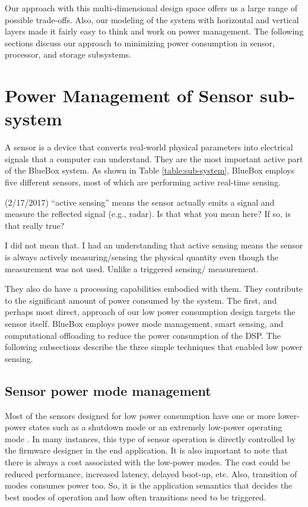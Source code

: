  
Our approach with this multi-dimensional design space offers us a
large range of possible trade-offs. Also, our modeling of the system
with horizontal and vertical layers made it fairly easy to think and
work on power management. The following sections discuss our approach
to minimizing power consumption in sensor, processor, and storage
subsystems.
 
 \section{Power Management of Sensor sub-system}
 
A sensor is a device that converts real-world physical parameters
into electrical signals that a computer can understand. They are the
most important active part of the BlueBox system. As shown in Table
\ref{table:sub-system}, BlueBox employs five different sensors, most
of which are performing active real-time sensing.
\begin{cmtPai}
	(2/17/2017) ``active sensing'' means the sensor actually emits a
	signal and measure the reflected signal (e.g., radar). Is that what
	you mean here? If so, is that really true?
\end{cmtPai}

\begin{cmtSMS}
		I did not mean that. I had an understanding that active sensing means the sensor is always actively measuring/sensing the physical quantity even though the measurement was not used. Unlike a triggered sensing/ measurement.
		 	
\end{cmtSMS}

They also do have a processing capabilities embodied with them. They
contribute to the significant amount of power consumed by the system.
The first, and perhaps most direct, approach of our low power
consumption design targets the sensor itself. BlueBox employs power
mode management, smart sensing, and computational offloading to
reduce the power consumption of the DSP. The following subsections
describe the three simple techniques that enabled low power sensing.

 \subsection{Sensor power mode management}

Most of the sensors designed for low power consumption have one or
more lower-power states such as a shutdown mode or an extremely
low-power operating mode \cite{lowpwrsensing}. In many instances,
this type of sensor operation is directly controlled by the firmware
designer in the end application. It is also important to note that
there is always a cost associated with the low-power modes.  The cost
could be reduced performance, increased latency, delayed boot-up,
etc. Also, transition of modes consumes power too. So, it is the
application semantics that decides the best modes of operation and
how often transitions need to be triggered. 
 
